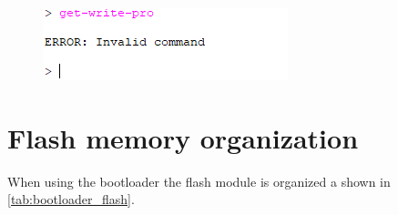 \begin{figure}[H]
    \centering
    \includegraphics[width=.4\linewidth]{images/bootloader_cmd_err.png}
    \label{fig:bootloader_cmd_err}
\end{figure}

\section{Flash memory organization}

When using the bootloader the flash module is organized a shown in \autoref{tab:bootloader_flash}. 

